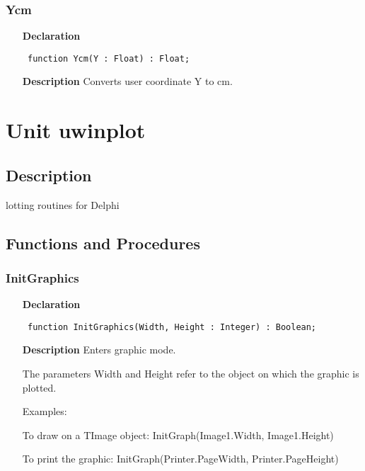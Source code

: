 \documentclass[12pt,a4paper,oneside]{report}
\newcommand{\declarationitem}[1]{\textbf{#1}}
\newcommand{\descriptiontitle}[1]{\textbf{#1}}
\newcommand{\code}[1]{\texttt{#1}}
\begin{document}
\subsubsection{Ycm}
\label{utexplot-Ycm}
\begin{itemize}\item[\declarationitem{Declaration}\hfill]
	\begin{flushleft}
		\code{
			function Ycm(Y : Float) : Float;}
		
	\end{flushleft}
	
	\par
	\item[\descriptiontitle{Description}]
	Converts user coordinate Y to cm.
	
\end{itemize}
\section{Unit uwinplot}
\label{uwinplot}
\subsection{Description}
lotting routines for Delphi
\subsection{Functions and Procedures}
\subsubsection{InitGraphics}
\label{uwinplot-InitGraphics}
\begin{itemize}\item[\declarationitem{Declaration}\hfill]
	\begin{flushleft}
		\code{
			function InitGraphics(Width, Height : Integer) : Boolean;}
		
	\end{flushleft}
	
	\par
	\item[\descriptiontitle{Description}]
	Enters graphic mode.
	
	The parameters Width and Height refer to the object on which the graphic is plotted.
	
	Examples:
	
	To draw on a TImage object: InitGraph(Image1.Width, Image1.Height)
	
	To print the graphic: InitGraph(Printer.PageWidth, Printer.PageHeight)
	
\end{itemize}
\end{document}
